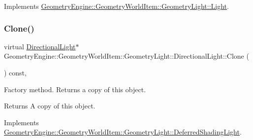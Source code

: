 Implements \mbox{\hyperlink{class_geometry_engine_1_1_geometry_world_item_1_1_geometry_light_1_1_light_a58aa2a3520f7aa2b03afcb4123e7530a}{Geometry\+Engine\+::\+Geometry\+World\+Item\+::\+Geometry\+Light\+::\+Light}}.

\mbox{\label{class_geometry_engine_1_1_geometry_world_item_1_1_geometry_light_1_1_directional_light_a032fe23fba3bd8d0fd35f9d4ac6a9de0}} 
\subsubsection{\texorpdfstring{Clone()}{Clone()}}
{\footnotesize\ttfamily virtual \mbox{\hyperlink{class_geometry_engine_1_1_geometry_world_item_1_1_geometry_light_1_1_directional_light}{Directional\+Light}}$\ast$ Geometry\+Engine\+::\+Geometry\+World\+Item\+::\+Geometry\+Light\+::\+Directional\+Light\+::\+Clone (\begin{DoxyParamCaption}{ }\end{DoxyParamCaption}) const\hspace{0.3cm}{\ttfamily [inline]}, {\ttfamily [virtual]}}

Factory method. Returns a copy of this object. \begin{DoxyReturn}{Returns}
A copy of this object. 
\end{DoxyReturn}


Implements \mbox{\hyperlink{class_geometry_engine_1_1_geometry_world_item_1_1_geometry_light_1_1_deferred_shading_light_a7ef4d7b7a41cbda01a55bcb0475484d3}{Geometry\+Engine\+::\+Geometry\+World\+Item\+::\+Geometry\+Light\+::\+Deferred\+Shading\+Light}}.

\mbox{\label{class_geometry_engine_1_1_geometry_world_item_1_1_geometry_light_1_1_directional_light_a8d249928526e73e380c049e27c732db9}} 
